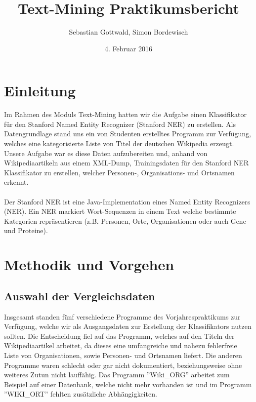 \documentclass[a4paper]{article}
\author{Sebastian Gottwald, Simon Bordewisch}
\title{Text-Mining Praktikumsbericht}
\date{4. Februar 2016}
\begin{document}
\begin{titlepage}
\maketitle
\end{titlepage}

\section{Einleitung}
	Im Rahmen des Moduls Text-Mining hatten wir die Aufgabe einen Klassifikator für den Stanford Named Entity Recognizer (Stanford NER) zu erstellen.
	Als Datengrundlage stand uns ein von Studenten erstelltes Programm zur Verfügung, welches eine kategorisierte Liste von Titel der deutschen Wikipedia erzeugt.
	Unsere Aufgabe war es diese Daten aufzubereiten und, anhand von Wikipediaartikeln aus einem XML-Dump, Trainingsdaten für den Stanford NER Klassifikator zu erstellen, welcher Personen-, Organisations- und Ortsnamen erkennt.
	\\\\
	Der Stanford NER ist eine Java-Implementation eines Named Entity Recognizers (NER).
	Ein NER markiert Wort-Sequenzen in einem Text welche bestimmte Kategorien repräsentieren (z.B. Personen, Orte, Organisationen oder auch Gene und Proteine).
\section{Methodik und Vorgehen}
	\subsection{Auswahl der Vergleichsdaten}
		Insgesamt standen fünf verschiedene Programme des Vorjahrespraktikums zur Verfügung, welche wir als Ausgangsdaten zur Erstellung der Klassifikators nutzen sollten.
		Die Entscheidung fiel auf das Programm, welches auf den Titeln der Wikipediaartikel arbeitet, da dieses eine umfangreiche und nahezu fehlerfreie Liste von Organisationen, sowie Personen- und Ortsnamen liefert.
		Die anderen Programme waren schlecht oder gar nicht dokumentiert, beziehungsweise ohne weiteres Zutun nicht lauffähig.
		Das Programm ''Wiki\_ORG'' arbeitet zum Beispiel auf einer Datenbank, welche nicht mehr vorhanden ist und im Programm ''WIKI\_ORT'' fehlten zusätzliche Abhängigkeiten.
\end{document}
